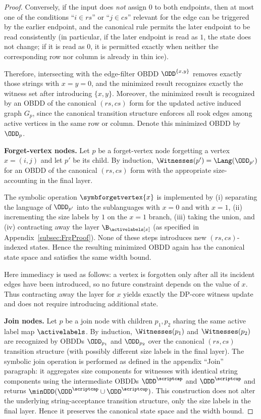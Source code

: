 \begin{proof}
Conversely, if the input does \emph{not} assign $0$ to both endpoints, then at
most one of the conditions ``$i\in rs$'' or ``$j\in cs$'' relevant for the edge
can be triggered by the earlier endpoint, and the canonical rule permits the
later endpoint to be read consistently (in particular, if the later endpoint is
read as $1$, the state does not change; if it is read as $0$, it is permitted
exactly when neither the corresponding row nor column is already in thin ice).

Therefore, intersecting with the edge-filter OBDD
$\ODD^{\{x,y\}}$ removes exactly those strings with $x=y=0$, and the minimized
result recognizes exactly the witness set after introducing $\{x,y\}$. Moreover,
the minimized result is recognized by an OBDD of the canonical $(rs,cs)$ form for
the updated active induced graph $G_p$, since the canonical transition structure
enforces all rook edges among active vertices in the same row or column. Denote
this minimized OBDD by $\ODD_p$.

\smallskip
\noindent\textbf{Forget-vertex nodes.}
Let $p$ be a forget-vertex node forgetting a vertex $x=(i,j)$ and let $p'$ be
its child. By induction, $\Witnesses(p')=\Lang(\ODD_{p'})$ for an OBDD of the
canonical $(rs,cs)$ form with the appropriate size-accounting in the final layer.

The symbolic operation $\symbforgetvertex{x}$ is implemented by (i) separating
the language of $\ODD_{p'}$ into the sublanguages with $x=0$ and with $x=1$,
(ii) incrementing the size labels by $1$ on the $x=1$ branch, (iii) taking the
union, and (iv) contracting away the layer $\B_{\activelabels[x]}$ (as specified
in Appendix~\ref{subsec:FrgProof}). None of these steps introduces new
$(rs,cs)$-indexed states. Hence the resulting minimized OBDD again has the
canonical state space and satisfies the same width bound.

Here immediacy is used as follows: a vertex is forgotten only after all its
incident edges have been introduced, so no future constraint depends on the
value of $x$. Thus contracting away the layer for $x$ yields exactly the
DP-core witness update and does not require introducing additional state.

\smallskip
\noindent\textbf{Join nodes.}
Let $p$ be a join node with children $p_1,p_2$ sharing the same active label map
$\activelabels$. By induction, $\Witnesses(p_1)$ and $\Witnesses(p_2)$ are
recognized by OBDDs $\ODD_{p_1}$ and $\ODD_{p_2}$ over the canonical $(rs,cs)$
transition structure (with possibly different size labels in the final layer).
The symbolic join operation is performed as defined in the appendix ``Join''
paragraph: it aggregates size components for witnesses with identical string
components using the intermediate OBDDs $\ODD^{\scriptcap}$ and $\ODD^{\scriptcup}$
and returns $\minODD(\ODD^{\scriptcap}\cup\ODD^{\scriptcup})$. This construction
does not alter the underlying string-acceptance transition structure, only the
size labels in the final layer. Hence it preserves the canonical state space and
the width bound.


\end{proof}
